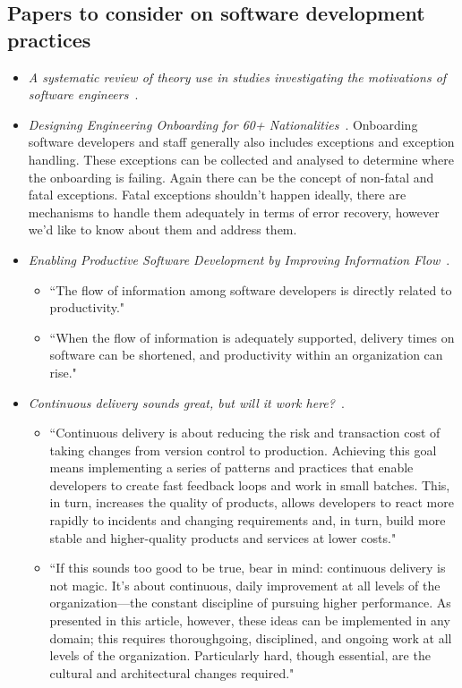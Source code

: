 \subsection{Papers to consider on software development practices}
\begin{itemize}
    \item \emph{A systematic review of theory use in studies investigating the motivations of software engineers}~\citep{hall2009systematic}.
    \item \emph{Designing Engineering Onboarding for 60+ Nationalities}~\citep{harty2020_designing_engineering_onboarding}. Onboarding software developers and staff generally also includes exceptions and exception handling. These exceptions can be collected and analysed to determine where the onboarding is failing. Again there can be the concept of non-fatal and fatal exceptions. Fatal exceptions shouldn't happen ideally, there are mechanisms to handle them adequately in terms of error recovery, however we'd like to know about them and address them.
    \item \emph{Enabling Productive Software Development by Improving Information Flow}~\citep{murphy_enabling_2019}. 
    \begin{itemize}
        \item ``The flow of information among software developers is directly related to productivity."
        \item ``When the flow of information is adequately supported, delivery times on software can be shortened, and productivity within an organization can rise."
    \end{itemize}
    \item \emph{Continuous delivery sounds great, but will it work here?}~\citep{humble2018_continuous_delivery_sounds_great}. 
    \begin{itemize}
        \item ``Continuous delivery is about reducing the risk and transaction cost of taking changes from version control to production. Achieving this goal means implementing a series of patterns and practices that enable developers to create fast feedback loops and work in small batches. This, in turn, increases the quality of products, allows developers to react more rapidly to incidents and changing requirements and, in turn, build more stable and higher-quality products and services at lower costs."
        \item ``If this sounds too good to be true, bear in mind: continuous delivery is not magic. It's about continuous, daily improvement at all levels of the organization—the constant discipline of pursuing higher performance. As presented in this article, however, these ideas can be implemented in any domain; this requires thoroughgoing, disciplined, and ongoing work at all levels of the organization. Particularly hard, though essential, are the cultural and architectural changes required."

\end{itemize}
\end{itemize}
